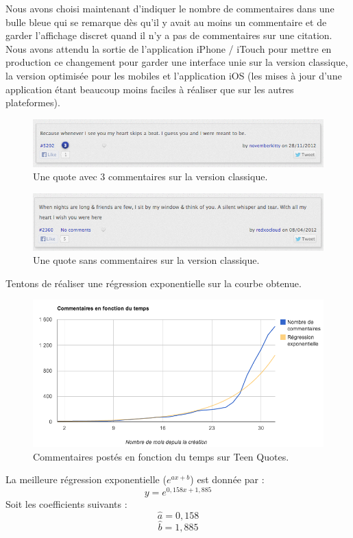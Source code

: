 \documentclass{report}
\begin{document}
	Nous avons choisi maintenant d'indiquer le nombre de commentaires dans une bulle bleue qui se remarque dès qu'il y avait au moins un commentaire et de garder l'affichage discret quand il n'y a pas de commentaires sur une citation. Nous avons attendu la sortie de l'application iPhone / iTouch pour mettre en production ce changement pour garder une interface unie sur la version classique, la version optimisée pour les mobiles et l'application iOS (les mises à jour d'une application étant beaucoup moins faciles à réaliser que sur les autres plateformes).
	\begin{figure}[H]
		\center
		\includegraphics[width=470px]{images/quoteCommentaires.png}
		\caption{Une quote avec 3 commentaires sur la version classique.}
	\end{figure}
	\begin{figure}[H]
		\center
		\includegraphics[width=470px]{images/quoteSansCommentaires.png}
		\caption{Une quote sans commentaires sur la version classique.}
	\end{figure}
	Tentons de réaliser une régression exponentielle sur la courbe obtenue.
	\begin{figure}[H]
		\center
		\includegraphics[width=450px]{images/commentairesRegression.png}
		\caption{Commentaires postés en fonction du temps sur Teen Quotes.}
	\end{figure}
	La meilleure régression exponentielle ($e^{ax + b}$) est donnée par :
	\[y = e^{0,158x + 1,885}\]
	Soit les coefficients suivants :
	\[\widehat{a} = 0,158\]
	\[\widehat{b} = 1,885\]
\end{document}
